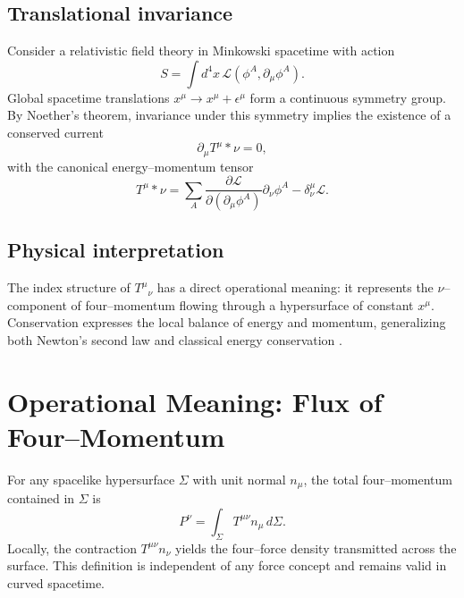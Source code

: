 \documentclass[11pt,a4paper]{article}
\begin{document}
\subsection{Translational invariance}
Consider a relativistic field theory in Minkowski spacetime with action
\begin{equation}
S = \int d^4x\, \mathcal{L}(\phi^A, \partial_\mu \phi^A).
\end{equation}
Global spacetime translations $x^\mu \to x^\mu + \epsilon^\mu$ form a continuous symmetry group. By Noether's theorem, invariance under this symmetry implies the existence of a conserved current
\begin{equation}
\partial_\mu T^{\mu}{}*{\nu} = 0,
\end{equation}
with the canonical energy--momentum tensor
\begin{equation}
T^{\mu}{}*{\nu} = \sum_A \frac{\partial \mathcal{L}}{\partial(\partial_\mu \phi^A)} \partial_\nu \phi^A - \delta^{\mu}_{\nu}\mathcal{L}.
\end{equation}

\subsection{Physical interpretation}
The index structure of $T^{\mu}{}_{\nu}$ has a direct operational meaning: it represents the $\nu$--component of four--momentum flowing through a hypersurface of constant $x^\mu$. Conservation expresses the local balance of energy and momentum, generalizing both Newton's second law and classical energy conservation \cite{Noether1918,Landau2}.

\section{Operational Meaning: Flux of Four--Momentum}
For any spacelike hypersurface $\Sigma$ with unit normal $n_\mu$, the total four--momentum contained in $\Sigma$ is
\begin{equation}
P^\nu = \int_\Sigma T^{\mu\nu} n_\mu\, d\Sigma.
\end{equation}
Locally, the contraction $T^{\mu\nu} n_\nu$ yields the four--force density transmitted across the surface. This definition is independent of any force concept and remains valid in curved spacetime.
\end{document}
